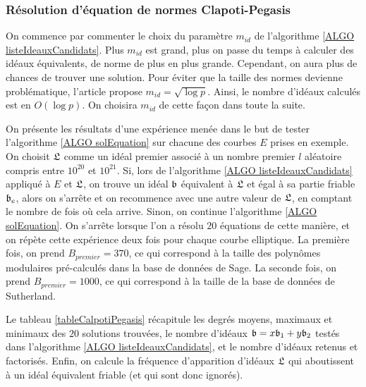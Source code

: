 \subsubsection{Résolution d'équation de normes Clapoti-Pegasis}

On commence par commenter le choix du paramètre $m_{id}$ de l'algorithme \ref{ALGO listeIdeauxCandidats}. Plus $m_{id}$ est grand, plus on passe du temps à calculer des idéaux équivalents, de norme de plus en plus grande. Cependant, on aura plus de chances de trouver une solution. Pour éviter que la taille des normes devienne problématique, l'article \cite{Pegasis} propose $m_{id} = \sqrt{\log p}$. Ainsi, le nombre d'idéaux calculés est en $O(\log p)$. On choisira $m_{id}$ de cette façon dans toute la suite.

On présente les résultats d'une expérience menée dans le but de tester l'algorithme \ref{ALGO solEquation} sur chacune des courbes $E$ prises en exemple. On choisit $\mathfrak{L}$ comme un idéal premier associé à un nombre premier $l$ aléatoire compris entre $10^{20}$ et $10^{21}$. Si, lors de l'algorithme \ref{ALGO listeIdeauxCandidats} appliqué à $E$ et $\mathfrak{L}$, on trouve un idéal $\mathfrak{b}$ équivalent à $\mathfrak{L}$ et égal à sa partie friable $\mathfrak{b}_e$, alors on s'arrête et on recommence avec une autre valeur de $\mathfrak{L}$, en comptant le nombre de fois où cela arrive. Sinon, on continue l'algorithme \ref{ALGO solEquation}. On s'arrête lorsque l'on a résolu $20$ équations de cette manière, et on répète cette expérience deux fois pour chaque courbe elliptique. La première fois, on prend $B_{premier} = 370$, ce qui correspond à la taille des polynômes modulaires pré-calculés dans la base de données de Sage. La seconde fois, on prend $B_{premier} = 1000$, ce qui correspond à la taille de la base de données de Sutherland. 

Le tableau \ref{tableCalpotiPegasis} récapitule les degrés moyens, maximaux et minimaux des $20$ solutions trouvées, le nombre d'idéaux $\mathfrak{b} = x\mathfrak{b}_1 + y\mathfrak{b}_2$ testés dans l'algorithme \ref{ALGO listeIdeauxCandidats}, et le nombre d'idéaux retenus et factorisés. Enfin, on calcule la fréquence d'apparition d'idéaux $\mathfrak{L}$ qui aboutissent à un idéal équivalent friable (et qui sont donc ignorés).
 

